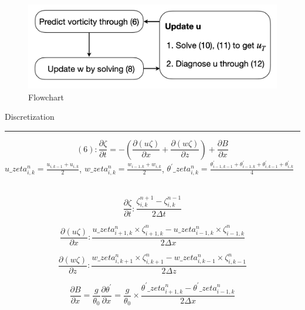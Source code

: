 \documentclass[a4paper,fleqn,10pt]{report}
\begin{document}
\begin{CJK*}{UTF8}{bsmi}
\begin{figure} [ht]
\includegraphics[width=1\textwidth] {flowchart.png}
\caption{Flowchart}
\end{figure}

Discretization 

\rule{16.5cm}{1pt}

\begin{equation*}
(6): \frac{\partial \zeta}{\partial t} = -(\frac{\partial (u\zeta)}{\partial x} + \frac{\partial (w\zeta)}{\partial z}) + \frac{\partial B}{\partial x}
\end{equation*}
\quad $u\_zeta^{n}_{i,k} = \frac{u_{i,k-1} + u_{i,k}}{2}$, $w\_zeta^{n}_{i,k} = \frac{w_{i-1,k} + w_{i,k}}{2}$, $\theta^{'} \_zeta^{n}_{i,k} = \frac{\theta^{'}_{i-1,k-1} + \theta^{'}_{i-1,k} + \theta^{'}_{i,k-1} + \theta^{'}_{i,k}}{4}$ \\\\


\begin{equation*}{}
\frac{\partial \zeta}{\partial t}: \frac{\zeta^{n+1}_{i,k} - \zeta^{n-1}_{i,k}}{2\Delta t}
\end{equation*}

\begin{equation*}{}
\frac{\partial (u\zeta)}{\partial x}: \frac{u\_zeta^{n}_{i+1,k}\times \zeta^{n}_{i+1,k} - u\_zeta^{n}_{i-1,k}\times \zeta^{n}_{i-1,k}}{2\Delta x}
\end{equation*}

\begin{equation*}{}
\frac{\partial (w\zeta)}{\partial z}: \frac{w\_zeta^{n}_{i,k+1}\times \zeta^{n}_{i,k+1} - w\_zeta^{n}_{i,k-1}\times \zeta^{n}_{i,k-1}}{2\Delta z}
\end{equation*}

\begin{equation*}{}
\frac{\partial B}{\partial x} = \frac{g}{\theta_0} \frac{\partial \theta^{'}}{\partial x} = \frac{g}{\theta_0} \times \frac{\theta^{'} \_zeta^{n}_{i+1,k} - \theta^{'} \_zeta^{n}_{i-1,k}}{2\Delta x}
\end{equation*}


\end{CJK*}
\end{document}
